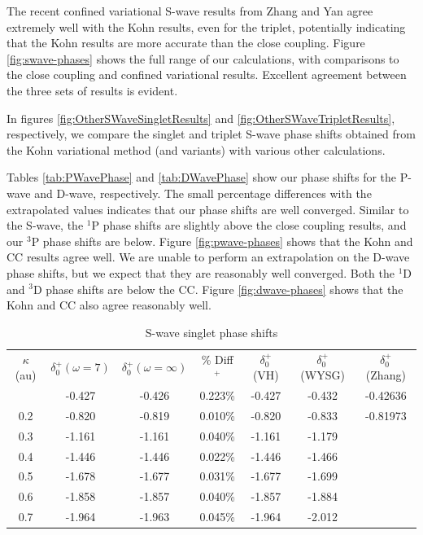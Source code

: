 \documentclass[preprint,showpacs,preprintnumbers,amsmath,amssymb]{revtex4}
\newcommand{\todoi}{\todo[inline]}
\begin{document}
The recent confined variational S-wave results from Zhang and Yan \cite{Zhang2012} agree extremely well with the Kohn results, even for the triplet, potentially indicating that the Kohn results are more accurate than the close coupling. Figure \ref{fig:swave-phases} shows the full range of our calculations, with comparisons to the close coupling and confined variational results. Excellent agreement between the three sets of results is evident.


In figures \ref{fig:OtherSWaveSingletResults} and \ref{fig:OtherSWaveTripletResults}, respectively,
we compare the singlet and triplet S-wave phase shifts obtained from the Kohn variational
method (and variants) with various other calculations. \todoi{Compare?}

Tables \ref{tab:PWavePhase} and \ref{tab:DWavePhase} show our phase shifts for the P-wave and D-wave, respectively. The small percentage differences with the extrapolated values indicates that our phase shifts are well converged. Similar to the S-wave, the $^1$P phase shifts are slightly above the close coupling results, and our $^3$P phase shifts are below. Figure \ref{fig:pwave-phases} shows that the Kohn and CC results agree well. We are unable to perform an extrapolation on the D-wave phase shifts, but we expect that they are reasonably well converged. Both the $^1$D and $^3$D phase shifts are below the CC. Figure \ref{fig:dwave-phases} shows that the Kohn and CC also agree reasonably well. \todoi{What else should we say about this?}


\begin{table}[H]
\centering
\begin{ruledtabular}
\begin{tabular}{c c c c c c c}
$\kappa$ (au) & $\delta_0^+ (\omega = 7)$ & $\delta_0^+ (\omega =\infty)$ & \% Diff$^+$ & $\delta_0^+$ (VH) & $\delta_0^+$ (WYSG) & $\delta_0^+$ (Zhang)\\
\colrule
0.1 & -0.427 & -0.426 & 0.223\% & -0.427 & -0.432 & -0.42636 \\
0.2 & -0.820 & -0.819 & 0.010\% & -0.820 & -0.833 & -0.81973 \\
0.3 & -1.161 & -1.161 & 0.040\% & -1.161 & -1.179 & \\
0.4 & -1.446 & -1.446 & 0.022\% & -1.446 & -1.466 & \\
0.5 & -1.678 & -1.677 & 0.031\% & -1.677 & -1.699 & \\
0.6 & -1.858 & -1.857 & 0.040\% & -1.857 & -1.884 & \\
0.7 & -1.964 & -1.963 & 0.045\% & -1.964 & -2.012 & \\
\end{tabular}
\end{ruledtabular}
\caption{S-wave singlet phase shifts}
\label{tab:SWaveSingletPhase}
\end{table}
\end{document}
